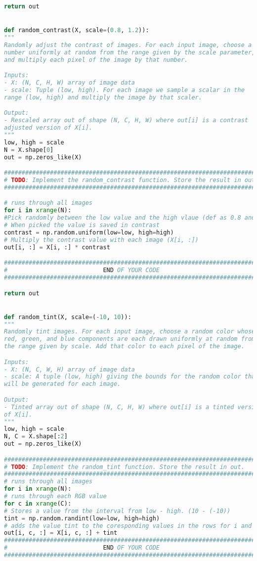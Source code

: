 \begin{lstlisting}[language=Python, label=lst:data_augmentation.py, caption={data\_augmentation.py}, basicstyle=\tiny]
return out


def random_contrast(X, scale=(0.8, 1.2)):
"""
Randomly adjust the contrast of images. For each input image, choose a
number uniformly at random from the range given by the scale parameter,
and multiply each pixel of the image by that number.

Inputs:
- X: (N, C, H, W) array of image data
- scale: Tuple (low, high). For each image we sample a scalar in the
range (low, high) and multiply the image by that scaler.

Output:
- Rescaled array out of shape (N, C, H, W) where out[i] is a contrast
adjusted version of X[i].
"""
low, high = scale
N = X.shape[0]
out = np.zeros_like(X)

#############################################################################
# TODO: Implement the random_contrast function. Store the result in out.    #
#############################################################################

# runs through all images
for i in xrange(N):
#Pick randomly between the low value and the high vlaue (def as 0.8 and 1.2 in line 77)
# When picked the value is saved in contrast
contrast = np.random.uniform(low=low, high=high)
# Multiply the contrast value with each image (X[i, :])
out[i, :] = X[i, :] * contrast

#############################################################################
#                           END OF YOUR CODE                                #
#############################################################################

return out


def random_tint(X, scale=(-10, 10)):
"""
Randomly tint images. For each input image, choose a random color whose
red, green, and blue components are each drawn uniformly at random from
the range given by scale. Add that color to each pixel of the image.

Inputs:
- X: (N, C, W, H) array of image data
- scale: A tuple (low, high) giving the bounds for the random color that
will be generated for each image.

Output:
- Tinted array out of shape (N, C, H, W) where out[i] is a tinted version
of X[i].
"""
low, high = scale
N, C = X.shape[:2]
out = np.zeros_like(X)

#############################################################################
# TODO: Implement the random_tint function. Store the result in out.        #
#############################################################################
# runs through all images
for i in xrange(N):
# runs through each RGB value
for c in xrange(C):
# Stores a value from the interval from low - high. (10 - (-10))
tint = np.random.randint(low=low, high=high)
# adds the value tint to the coresponding values in the rows for i and c.
out[i, c, :] = X[i, c, :] + tint
#############################################################################
#                           END OF YOUR CODE                                #
#############################################################################


\end{lstlisting}
